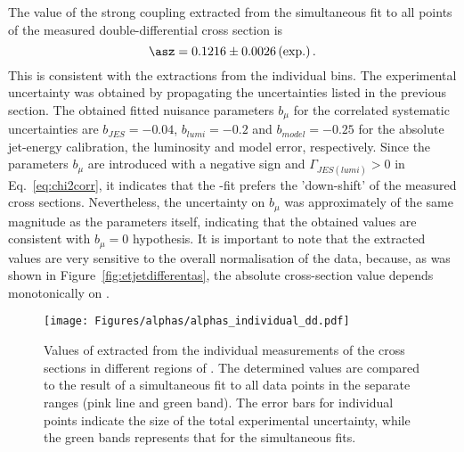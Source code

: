 The value of the strong coupling extracted from the simultaneous fit to all points of the measured double-differential cross section is
\begin{equation}
 \asz = 0.1216 \pm 0.0026 \left( \text{exp.} \right). %
 \label{eq:asdoubledifval}
\end{equation}
This is consistent with the extractions from the individual \qsq bins. The experimental uncertainty was obtained by propagating the uncertainties listed in the previous section. The obtained fitted nuisance parameters $b_{\mu}$ for the correlated systematic uncertainties are $b_{JES}=-0.04$, $b_{lumi}=-0.2$ and $b_{model}=-0.25$ for the absolute jet-energy calibration, the luminosity and model error, respectively. Since the parameters $b_{\mu}$ are introduced with a negative sign and $\Gamma_{JES\left(lumi\right)}>0$ in Eq.~\eqref{eq:chi2corr}, it indicates that the \as-fit prefers the 'down-shift' of the measured cross sections. Nevertheless, the uncertainty on $b_{\mu}$ was approximately of the same magnitude as the parameters itself, indicating that the obtained values are consistent with $b_\mu=0$ hypothesis. It is important to note that the extracted \as values are very sensitive to the overall normalisation of the data, because, as was shown in Figure~\ref{fig:etjetdifferentas}, the absolute cross-section value depends monotonically on \asz.

\begin{figure}[p]
 \centering
 \texttt{[image: Figures/alphas/alphas\_individual\_dd.pdf]}
 \caption{Values of \asz extracted from the individual measurements of the \dsdetjetb cross sections in different regions of \qsq. The determined values are compared to the result of a simultaneous fit to all data points in the separate \qsq ranges (pink line and green band). The error bars for individual points indicate the size of the total experimental uncertainty, while the green bands represents that for the simultaneous fits.}
 \label{fig:asindividual_dd}
\end{figure}

% 
